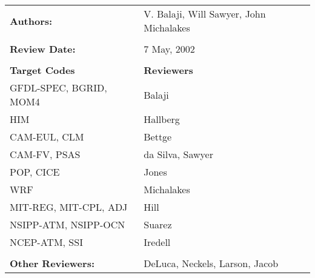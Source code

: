 

\begin{tabular}{l l}

{\bf Authors:}  & V. Balaji, Will Sawyer, John Michalakes\\ \\

{\bf Review Date:}            & 7 May, 2002 \\ \\

{\bf Target Codes}            & {\bf Reviewers} \\
GFDL-SPEC, BGRID, MOM4        & Balaji \\ 
HIM                           & Hallberg \\
CAM-EUL, CLM                  & Bettge \\
CAM-FV, PSAS                  & da Silva, Sawyer\\
POP, CICE                     & Jones \\
WRF                           & Michalakes \\
MIT-REG, MIT-CPL, ADJ         & Hill \\
NSIPP-ATM, NSIPP-OCN          & Suarez \\
NCEP-ATM, SSI                 & Iredell \\ \\

{\bf Other Reviewers:}        & DeLuca, Neckels, Larson, Jacob

\end{tabular}


